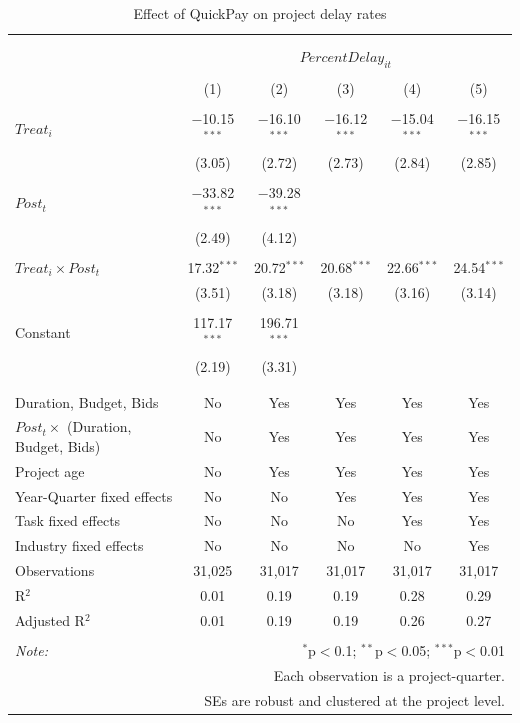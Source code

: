 \documentclass[
]{article}
\begin{document}
\begin{table}[H] \centering 
  \caption{Effect of QuickPay on project delay rates} 
  \label{} 
\small 
\begin{tabular}{@{\extracolsep{-2pt}}lccccc} 
\\[-1.8ex]\hline 
\hline \\[-1.8ex] 
\\[-1.8ex] & \multicolumn{5}{c}{$PercentDelay_{it}$} \\ 
\\[-1.8ex] & (1) & (2) & (3) & (4) & (5)\\ 
\hline \\[-1.8ex] 
 $Treat_i$ & $-$10.15$^{***}$ & $-$16.10$^{***}$ & $-$16.12$^{***}$ & $-$15.04$^{***}$ & $-$16.15$^{***}$ \\ 
  & (3.05) & (2.72) & (2.73) & (2.84) & (2.85) \\ 
  & & & & & \\ 
 $Post_t$ & $-$33.82$^{***}$ & $-$39.28$^{***}$ &  &  &  \\ 
  & (2.49) & (4.12) &  &  &  \\ 
  & & & & & \\ 
 $Treat_i \times Post_t$ & 17.32$^{***}$ & 20.72$^{***}$ & 20.68$^{***}$ & 22.66$^{***}$ & 24.54$^{***}$ \\ 
  & (3.51) & (3.18) & (3.18) & (3.16) & (3.14) \\ 
  & & & & & \\ 
 Constant & 117.17$^{***}$ & 196.71$^{***}$ &  &  &  \\ 
  & (2.19) & (3.31) &  &  &  \\ 
  & & & & & \\ 
\hline \\[-1.8ex] 
Duration, Budget, Bids & No & Yes & Yes & Yes & Yes \\ 
$Post_t \times$  (Duration, Budget, Bids) & No & Yes & Yes & Yes & Yes \\ 
Project age & No & Yes & Yes & Yes & Yes \\ 
Year-Quarter fixed effects & No & No & Yes & Yes & Yes \\ 
Task fixed effects & No & No & No & Yes & Yes \\ 
Industry fixed effects & No & No & No & No & Yes \\ 
Observations & 31,025 & 31,017 & 31,017 & 31,017 & 31,017 \\ 
R$^{2}$ & 0.01 & 0.19 & 0.19 & 0.28 & 0.29 \\ 
Adjusted R$^{2}$ & 0.01 & 0.19 & 0.19 & 0.26 & 0.27 \\ 
\hline 
\hline \\[-1.8ex] 
\textit{Note:}  & \multicolumn{5}{r}{$^{*}$p$<$0.1; $^{**}$p$<$0.05; $^{***}$p$<$0.01} \\ 
 & \multicolumn{5}{r}{Each observation is a project-quarter.} \\ 
 & \multicolumn{5}{r}{SEs are robust and clustered at the project level.} \\ 
\end{tabular} 
\end{table}
\end{document}
